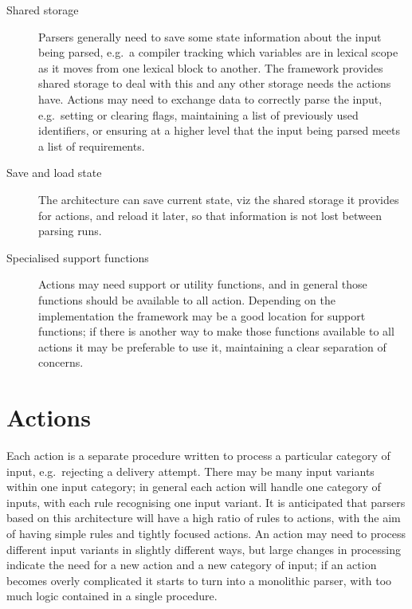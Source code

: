 \begin{description}
    \item [Shared storage]  Parsers generally need to save some state
        information about the input being parsed, e.g.\ a compiler tracking
        which variables are in lexical scope as it moves from one lexical
        block to another.  The framework provides shared storage to deal
        with this and any other storage needs the actions have.  Actions
        may need to exchange data to correctly parse the input, e.g.\
        setting or clearing flags, maintaining a list of previously used
        identifiers, or ensuring at a higher level that the input being
        parsed meets a list of requirements.

    \item [Save and load state]  The architecture can save current state,
        viz the shared storage it provides for actions, and reload it
        later, so that information is not lost between parsing runs.

    \item [Specialised support functions]  Actions may need support or
        utility functions, and in general those functions should be
        available to all action.  Depending on the implementation the
        framework may be a good location for support functions; if there is
        another way to make those functions available to all actions it may
        be preferable to use it, maintaining a clear separation of
        concerns.

\end{description}

\section{Actions}

\label{actions in architecture}

Each action is a separate procedure written to process a particular
category of input, e.g.\ rejecting a delivery attempt.  There may be many
input variants within one input category; in general each action will
handle one category of inputs, with each rule recognising one input
variant.  It is anticipated that parsers based on this architecture will
have a high ratio of rules to actions, with the aim of having simple rules
and tightly focused actions.  An action may need to process different input
variants in slightly different ways, but large changes in processing
indicate the need for a new action and a new category of input; if an
action becomes overly complicated it starts to turn into a monolithic
parser, with too much logic contained in a single procedure.

